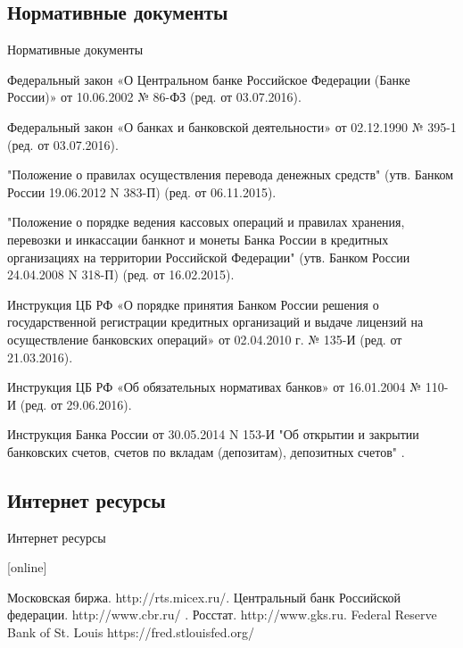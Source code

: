 \documentclass[_DKB_p1_Money.tex]{subfiles}
\begin{document}
\subsection*{Нормативные документы}

\begin{frame}[allowframebreaks]{Нормативные документы}
  \begin{thebibliography}{10}
  
  \beamertemplatearticlebibitems
Федеральный закон «О Центральном банке Российское Федерации (Банке России)» от 10.06.2002 № 86-ФЗ (ред. от 03.07.2016).

Федеральный закон «О банках и банковской деятельности» от 02.12.1990 № 395-1 (ред. от 03.07.2016).

"Положение о правилах осуществления перевода денежных средств" (утв. Банком России 19.06.2012 N 383-П) (ред. от 06.11.2015).

\pagebreak

"Положение о порядке ведения кассовых операций и правилах хранения, перевозки и инкассации банкнот и монеты Банка России в кредитных организациях на территории Российской Федерации" (утв. Банком России 24.04.2008 N 318-П) (ред. от 16.02.2015).

Инструкция ЦБ РФ «О порядке принятия Банком России решения о государственной регистрации кредитных организаций и выдаче лицензий на осуществление банковских операций» от 02.04.2010 г. № 135-И  (ред. от 21.03.2016).

\pagebreak
Инструкция ЦБ РФ «Об обязательных нормативах банков» от 16.01.2004 № 110-И (ред. от 29.06.2016).

Инструкция Банка России от 30.05.2014 N 153-И "Об открытии и закрытии банковских счетов, счетов по вкладам (депозитам), депозитных счетов" .
  \end{thebibliography}
\end{frame}

\subsection*{Интернет ресурсы}
\begin{frame}[allowframebreaks]{Интернет ресурсы}
    
  \begin{thebibliography}{10}
  
  [online]

    Московская биржа.
    \newblock http://rts.micex.ru/.
    Центральный банк Российской федерации.
    \newblock http://www.cbr.ru/ .
    Росстат.
    \newblock http://www.gks.ru.
 	Federal Reserve Bank of St. Louis
	\newblock https://fred.stlouisfed.org/    
  \end{thebibliography}
\end{frame}
\end{document}
